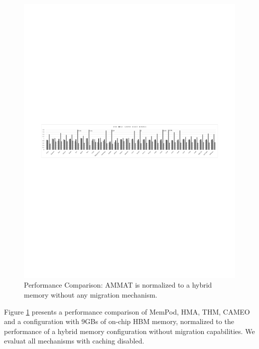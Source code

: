 \begin{figure}[t]
  \includegraphics[width=\textwidth]{figures/revised/old/comparison_no_cache.pdf}
  \caption{Performance Comparison: AMMAT is normalized to a hybrid memory without any migration mechanism.}
  \label{fig:performance}
\end{figure}

Figure \ref{fig:performance} presents a performance comparison of MemPod, HMA, THM, CAMEO and a configuration with 9GBs of on-chip HBM memory, normalized to the performance of a hybrid memory configuration without migration capabilities. We evaluat all mechanisms with caching disabled. 

